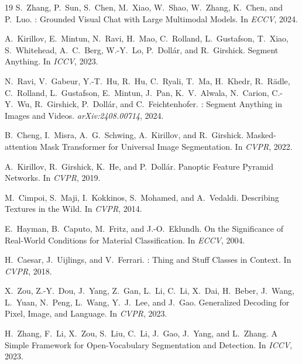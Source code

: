 \documentclass{article}
\begin{document}
\begin{thebibliography}{19}
S.~Zhang, P.~Sun, S.~Chen, M.~Xiao, W.~Shao, W.~Zhang, K.~Chen, and P.~Luo.
: Grounded Visual Chat with Large Multimodal Models.
\newblock In \emph{ECCV}, 2024.

A.~Kirillov, E.~Mintun, N.~Ravi, H.~Mao, C.~Rolland, L.~Gustafson, T.~Xiao, S.~Whitehead, A.~C.~Berg, W.-Y.~Lo, P.~Doll{\'a}r, and R.~Girshick.
\newblock Segment Anything.
\newblock In \emph{ICCV}, 2023.

N.~Ravi, V.~Gabeur, Y.-T.~Hu, R.~Hu, C.~Ryali, T.~Ma, H.~Khedr, R.~R{\"a}dle, C.~Rolland, L.~Gustafson, E.~Mintun, J.~Pan, K.~V.~Alwala, N.~Carion, C.-Y.~Wu, R.~Girshick, P.~Doll{\'a}r, and C.~Feichtenhofer.
: Segment Anything in Images and Videos.
\newblock \emph{arXiv:2408.00714}, 2024.

B.~Cheng, I.~Misra, A.~G.~Schwing, A.~Kirillov, and R.~Girshick.
\newblock Masked-attention Mask Transformer for Universal Image Segmentation.
\newblock In \emph{CVPR}, 2022.

A.~Kirillov, R.~Girshick, K.~He, and P.~Doll{\'a}r.
\newblock Panoptic Feature Pyramid Networks.
\newblock In \emph{CVPR}, 2019.

M.~Cimpoi, S.~Maji, I.~Kokkinos, S.~Mohamed, and A.~Vedaldi.
\newblock Describing Textures in the Wild.
\newblock In \emph{CVPR}, 2014.

E.~Hayman, B.~Caputo, M.~Fritz, and J.-O.~Eklundh.
\newblock On the Significance of Real-World Conditions for Material Classification.
\newblock In \emph{ECCV}, 2004.

H.~Caesar, J.~Uijlings, and V.~Ferrari.
: Thing and Stuff Classes in Context.
\newblock In \emph{CVPR}, 2018.

X.~Zou, Z.-Y.~Dou, J.~Yang, Z.~Gan, L.~Li, C.~Li, X.~Dai, H.~Beber, J.~Wang, L.~Yuan, N.~Peng, L.~Wang, Y.~J.~Lee, and J.~Gao.
\newblock Generalized Decoding for Pixel, Image, and Language.
\newblock In \emph{CVPR}, 2023.

H.~Zhang, F.~Li, X.~Zou, S.~Liu, C.~Li, J.~Gao, J.~Yang, and L.~Zhang.
\newblock A Simple Framework for Open-Vocabulary Segmentation and Detection.
\newblock In \emph{ICCV}, 2023.


\end{thebibliography}
\end{document}
